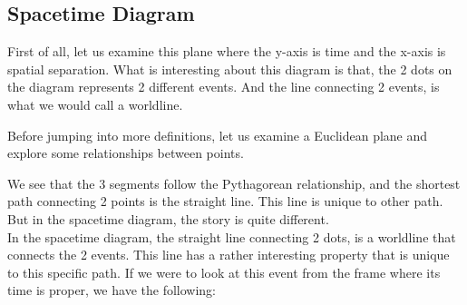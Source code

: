 \documentclass[12pt]{book}
\begin{document}
\subsection{Spacetime Diagram}
First of all, let us examine this plane where the y-axis is time and the x-axis is spatial separation.
\newline
What is interesting about this diagram is that, the 2 dots on the diagram represents 2 different events. And the line connecting 2 events, is what we would call a worldline.

\begin{center}
\end{center}
Before jumping into more definitions, let us examine a Euclidean plane and explore some relationships between points.
\begin{center}
\end{center}
We see that the 3 segments follow the Pythagorean relationship, and the shortest path connecting 2 points is the straight line. This line is unique to other path. But in the spacetime diagram, the story is quite different. \\
\newline
In the spacetime diagram, the straight line connecting 2 dots, is a worldline that connects the 2 events. This line has a rather interesting property that is unique to this specific path. If we were to look at this event from the frame where its time is proper, we have the following:
\begin{center}
\end{center}
\end{document}
